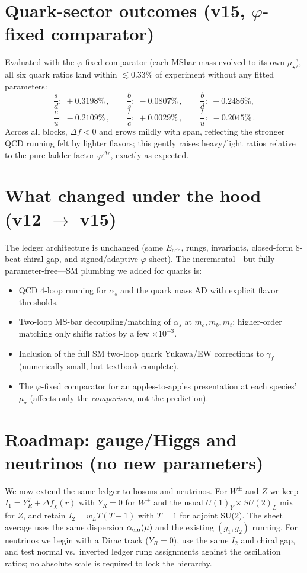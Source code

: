 \documentclass[12pt]{article}
\begin{document}
\section*{Quark-sector outcomes (v15, $\varphi$-fixed comparator)}
Evaluated with the $\varphi$-fixed comparator (each MS\={ }bar mass evolved to its own $\mu_\star$), all six quark ratios land within $\lesssim0.33\%$ of experiment without any fitted parameters:
\[
\frac{s}{d}:\; +0.3198\%\,,\qquad
\frac{b}{s}:\; -0.0807\%\,,\qquad
\frac{b}{d}:\; +0.2486\%,
\]
\[
\frac{c}{u}:\; -0.2109\%\,,\qquad
\frac{t}{c}:\; +0.0029\%\,,\qquad
\frac{t}{u}:\; -0.2045\%\,.
\]
Across all blocks, $\Delta f<0$ and grows mildly with span, reflecting the stronger QCD running felt by lighter flavors; this gently raises heavy/light ratios relative to the pure ladder factor $\varphi^{\Delta r}$, exactly as expected.

\section*{What changed under the hood (v12 $\to$ v15)}
The ledger architecture is unchanged (same $E_{\mathrm{coh}}$, rungs, invariants, closed-form $8$-beat chiral gap, and signed/adaptive $\varphi$-sheet). The incremental---but fully parameter-free---SM plumbing we added for quarks is:
\begin{itemize}
\item QCD $4$-loop running for $\alpha_s$ and the quark mass AD with explicit flavor thresholds.
\item Two-loop MS-bar decoupling/matching of $\alpha_s$ at $m_c,m_b,m_t$; higher-order matching only shifts ratios by a few $\times10^{-3}$.
\item Inclusion of the full SM two-loop quark Yukawa/EW corrections to $\gamma_f$ (numerically small, but textbook-complete).
\item The $\varphi$-fixed comparator for an apples-to-apples presentation at each species’ $\mu_\star$ (affects only the \emph{comparison}, not the prediction).
\end{itemize}

\section*{Roadmap: gauge/Higgs and neutrinos (no new parameters)}
We now extend the same ledger to bosons and neutrinos. For $W^\pm$ and $Z$ we keep $I_1=Y_R^2+\Delta f_\chi(r)$ with $Y_R=0$ for $W^\pm$ and the usual $U(1)_Y\!\times\!SU(2)_L$ mix for $Z$, and retain $I_2=w_L T(T{+}1)$ with $T=1$ for adjoint SU(2). The sheet average uses the same dispersion $\alpha_{\rm em}(\mu)$ and the existing $(g_1,g_2)$ running. For neutrinos we begin with a Dirac track ($Y_R=0$), use the same $I_2$ and chiral gap, and test normal vs.~inverted ledger rung assignments against the oscillation ratios; no absolute scale is required to lock the hierarchy.
\end{document}

